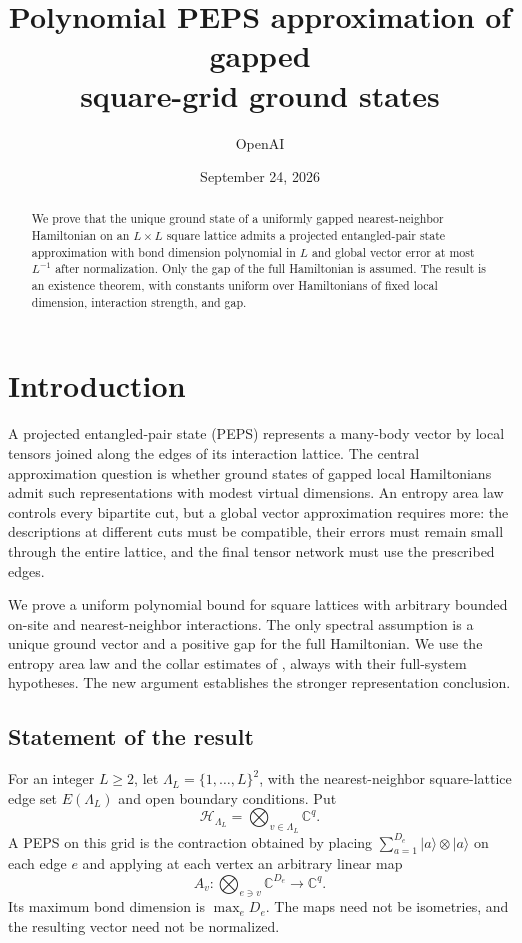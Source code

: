 \documentclass[11pt]{article}
\title{Polynomial PEPS approximation of gapped\texorpdfstring{\\}{ }square-grid ground states}
\author{OpenAI}
\date{September 24, 2026}
\numberwithin{equation}{section}
\theoremstyle{definition}
\theoremstyle{remark}
\begin{document}
\maketitle
\begin{abstract}
We prove that the unique ground state of a uniformly gapped nearest-neighbor
Hamiltonian on an $L\times L$ square lattice admits a projected entangled-pair
state approximation with bond dimension polynomial in $L$ and global vector
error at most $L^{-1}$ after normalization. Only the gap of the full Hamiltonian is assumed.
The result is an existence theorem, with constants uniform over
Hamiltonians of fixed local dimension, interaction strength, and gap.
\end{abstract}
\tableofcontents
\clearpage
\section{Introduction}\label{sec:introduction}

A projected entangled-pair state (PEPS) represents a many-body vector by local
tensors joined along the edges of its interaction lattice. The central
approximation question is whether ground states of gapped local Hamiltonians
admit such representations with modest virtual dimensions. An entropy area
law controls every bipartite cut, but a global vector approximation requires
more: the descriptions at different cuts must be compatible, their errors
must remain small through the entire lattice, and the final tensor network
must use the prescribed edges.

We prove a uniform polynomial bound for square lattices with arbitrary
bounded on-site and nearest-neighbor interactions. The only spectral
assumption is a unique ground vector and a positive gap for the full
Hamiltonian. We use the entropy area law and the collar estimates of
\cite{RepoAreaLaw}, always with their full-system hypotheses. The new argument
establishes the stronger representation conclusion.

\subsection{Statement of the result}

For an integer $L\ge2$, let $\Lambda_L=\{1,\ldots,L\}^2$, with the
nearest-neighbor square-lattice edge set $E(\Lambda_L)$ and open boundary
conditions. Put
\[
 \mathcal H_{\Lambda_L}=\bigotimes_{v\in\Lambda_L}\mathbb C^q.
\]
A PEPS on this grid is the contraction obtained by placing
$\sum_{a=1}^{D_e}|a\rangle\otimes|a\rangle$ on each edge $e$ and applying
at each vertex an arbitrary linear map
\[
 A_v:\bigotimes_{e\ni v}\mathbb C^{D_e}\longrightarrow\mathbb C^q.
\]
Its maximum bond dimension is $\max_eD_e$. The maps need not be isometries,
and the resulting vector need not be normalized.
\end{document}
